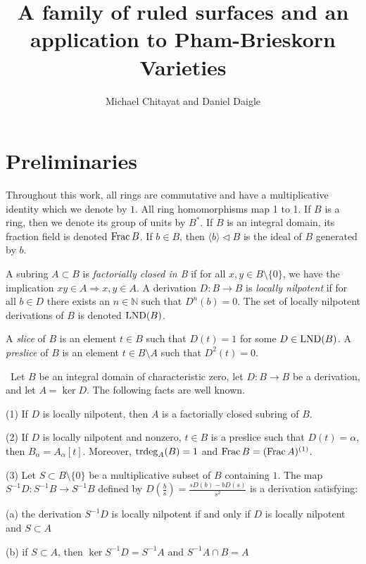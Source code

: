 \documentclass[12pt]{amsart}
\theoremstyle{plain}
\theoremstyle{definition}
\newcommand{\trdeg}{	\operatorname{{\rm trdeg}}}
\newcommand{\Frac}{		\operatorname{{\rm Frac}}}
\newcommand{\lb}{\langle}
\newcommand{\rb}{\rangle}
\newcommand{\Nat}{\ensuremath{\mathbb{N}}}
\newcommand{\lnd}{\operatorname{{\rm LND}}}
\begin{document}
	\renewcommand{\baselinestretch}{1.07}
	
	
	
	
	\title{A family of ruled surfaces and an application to Pham-Brieskorn Varieties}
	
	
	\author{Michael Chitayat and Daniel Daigle}
	
	\maketitle
	
	\vfuzz=2pt
	
	
	\section{Preliminaries}
	
	Throughout this work, all rings are commutative and have a multiplicative identity which we denote by $1$.
	All ring homomorphisms map 1 to 1. If $B$ is a ring, then we denote its group of units by $B^*$.
	If $B$ is an integral domain, its fraction field is denoted $\Frac B$.
	If $b \in B$, then $\lb b \rb \lhd B$ is the ideal of $B$ generated by $b$.  
	
	A subring $A \subset B$ is \textit{factorially closed in B} if for all $x,y \in B \setminus\{0\}$, we have the implication $xy \in A \Rightarrow x,y \in A$. A derivation $D : B \to B$ is \textit{locally nilpotent} if for all $b \in D$ there exists an $n \in \Nat$ such that $D^n(b) = 0$.  The set of locally nilpotent derivations of $B$ is denoted $\lnd(B)$.
	
	A \textit{slice} of $B$ is an element $t \in B$ such that $D(t) = 1$ for some $D \in \lnd(B)$.  A \textit{preslice} of $B$ is an element $t \in B \setminus A$ such that $D^2(t) = 0$.     
	
	\begin{subsection}\  	
		Let $B$ be an integral domain of characteristic zero, let $D : B \to B$ be a derivation, and let $A = \ker D$. The following facts are well known. 
		
		(1) If $D$ is locally nilpotent, then $A$ is a factorially closed subring of $B$. 
		
		(2) If $D$ is locally nilpotent and nonzero, $t \in B$ is a preslice such that $D(t) = \alpha$, then $B_\alpha = A_\alpha[t]$. Moreover, $\trdeg_A(B) = 1$ and $\Frac B  = (\Frac A)^{(1)}$.
		
		(3) Let $S \subset B \setminus \{0\}$ be a multiplicative subset of $B$ containing $1$. The map $S^{-1}D : S^{-1} B \to S^{-1} B$ defined by $D(\frac{b}{s}) = \frac{sD(b)-bD(s)}{s^2}$ is a derivation satisfying: 
		
		\quad (a) the derivation $S^{-1}D$ is locally nilpotent if and only if $D$ is locally nilpotent and $S \subset A$
		
		\quad (b) if $S \subset A$, then $\ker S^{-1}D = S^{-1}A$ and $S^{-1}A \cap B = A$
	\end{subsection}
	
\end{document}
